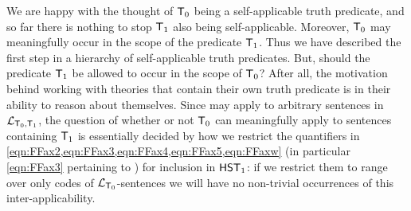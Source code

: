 \documentclass[UKenglish,cleveref,DIV=12]{scrartcl}
\theoremstyle{definition}
\theoremstyle{definition}
\begin{document}

We are happy with the thought of $\mathsf{T}_0$ being a self-applicable truth predicate,
and so far there is nothing to stop $\mathsf{T}_1$ also being self-applicable. Moreover, $\mathsf{T}_0$
may meaningfully occur in the scope of the predicate $\mathsf{T}_1$. Thus we have described the
first step in a hierarchy of self-applicable truth predicates. But, should the
predicate $\mathsf{T}_1$ be allowed to occur in the scope of $\mathsf{T}_0$? After all, the
motivation behind working with theories that contain their own truth predicate
is in their ability to reason about themselves.
Since
 may apply to arbitrary sentences in $\mathcal{L}_{\mathsf{T}_0,\mathsf{T}_1}$, the question
of whether or not $\mathsf{T}_0$ can meaningfully apply to sentences containing $\mathsf{T}_1$
is essentially decided by how we restrict the quantifiers in
\cref{eqn:FFax2,eqn:FFax3,eqn:FFax4,eqn:FFax5,eqn:FFaxw} (in
particular \cref{eqn:FFax3} pertaining to ) for inclusion in
$\mathsf{HST}_1$: if we restrict them to range over only codes of $\mathcal{L}_{\mathsf{T}_0}$-sentences we
will have no non-trivial occurrences of this inter-applicability.
\end{document}
